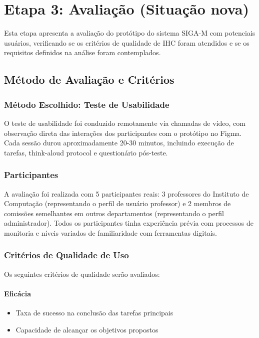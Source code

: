 \documentclass[12pt, a4paper]{report}
\begin{document}
\chapter{Etapa 3: Avaliação (Situação nova)}
\label{ch:avaliacao}

Esta etapa apresenta a avaliação do protótipo do sistema SIGA-M com potenciais usuários, verificando se os critérios de qualidade de IHC foram atendidos e se os requisitos definidos na análise foram contemplados.

\section{Método de Avaliação e Critérios}

\subsection{Método Escolhido: Teste de Usabilidade}

O teste de usabilidade foi conduzido remotamente via chamadas de vídeo, com observação direta das interações dos participantes com o protótipo no Figma. Cada sessão durou aproximadamente 20-30 minutos, incluindo execução de tarefas, think-aloud protocol e questionário pós-teste.

\subsection{Participantes}

A avaliação foi realizada com 5 participantes reais: 3 professores do Instituto de Computação (representando o perfil de usuário professor) e 2 membros de comissões semelhantes em outros departamentos (representando o perfil administrador). Todos os participantes tinha experiência prévia com processos de monitoria e níveis variados de familiaridade com ferramentas digitais.

\subsection{Critérios de Qualidade de Uso}

Os seguintes critérios de qualidade serão avaliados:

\subsubsection{Eficácia}
\begin{itemize}
    \item Taxa de sucesso na conclusão das tarefas principais
    \item Capacidade de alcançar os objetivos propostos
\end{itemize}
\end{document}
